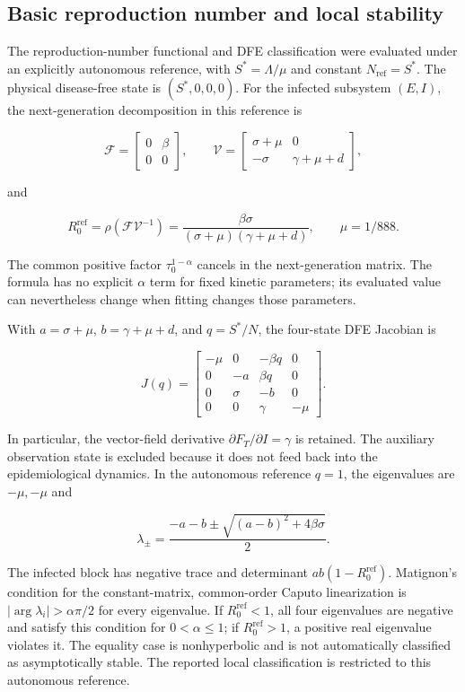\documentclass[pdflatex,sn-mathphys-ay]{sn-jnl}
\begin{document}
\subsection{Basic reproduction number and local stability}

The reproduction-number functional and DFE classification were evaluated under an explicitly autonomous reference, with $S^*=\Lambda/\mu$ and constant $N_{\mathrm{ref}}=S^*$. The physical disease-free state is $(S^*,0,0,0)$. For the infected subsystem $(E,I)$, the next-generation decomposition \citep{vandendriessche2002} in this reference is

\[
\mathcal F=\begin{bmatrix}0&\beta\\0&0\end{bmatrix},\qquad
\mathcal V=\begin{bmatrix}\sigma+\mu&0\\-\sigma&\gamma+\mu+d\end{bmatrix},
\]

and

\[
R_0^{\mathrm{ref}}=\rho(\mathcal F\mathcal V^{-1})=\frac{\beta\sigma}{(\sigma+\mu)(\gamma+\mu+d)},\qquad\mu=1/888.
\]

The common positive factor $\tau_0^{1-\alpha}$ cancels in the next-generation matrix. The formula has no explicit $\alpha$ term for fixed kinetic parameters; its evaluated value can nevertheless change when fitting changes those parameters.

With $a=\sigma+\mu$, $b=\gamma+\mu+d$, and $q=S^*/N$, the four-state DFE Jacobian is

\[
J(q)=\begin{bmatrix}
-\mu&0&-\beta q&0\\
0&-a&\beta q&0\\
0&\sigma&-b&0\\
0&0&\gamma&-\mu
\end{bmatrix}.
\]

In particular, the vector-field derivative $\partial F_T/\partial I=\gamma$ is retained. The auxiliary observation state is excluded because it does not feed back into the epidemiological dynamics. In the autonomous reference $q=1$, the eigenvalues are $-\mu,-\mu$ and

\[
\lambda_{\pm}=\frac{-a-b\pm\sqrt{(a-b)^2+4\beta\sigma}}{2}.
\]

The infected block has negative trace and determinant $ab(1-R_0^{\mathrm{ref}})$. Matignon's condition \citep{matignon1996} for the constant-matrix, common-order Caputo linearization is $|\arg\lambda_i|>\alpha\pi/2$ for every eigenvalue. If $R_0^{\mathrm{ref}}<1$, all four eigenvalues are negative and satisfy this condition for $0<\alpha\le1$; if $R_0^{\mathrm{ref}}>1$, a positive real eigenvalue violates it. The equality case is nonhyperbolic and is not automatically classified as asymptotically stable. The reported local classification is restricted to this autonomous reference.
\end{document}
